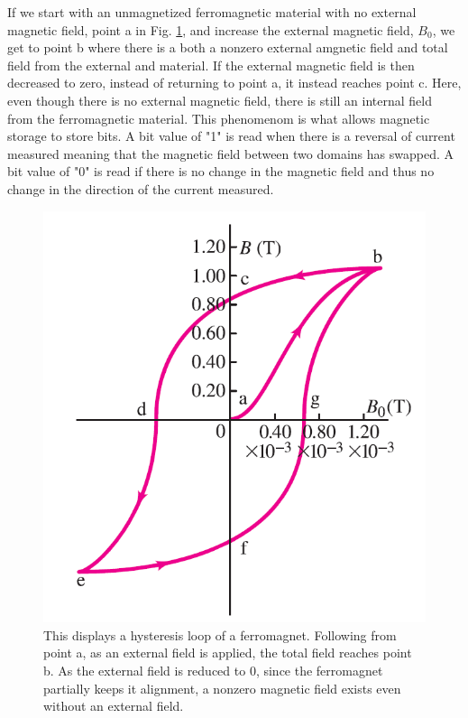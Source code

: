 \documentclass[ notitlepage, numerical, 11pt]{revtex4-1} %
\begin{document}
If we start with an unmagnetized ferromagnetic material with no external magnetic field, point a in Fig. \ref{hysteresis}, and increase the external magnetic field, $B_0$, we get to point b where there is a both a nonzero external amgnetic field and total field from the external and material. If the external magnetic field is then decreased to zero, instead of returning to point a, it instead reaches point c. Here, even though there is no external magnetic field, there is still an internal field from the ferromagnetic material. This phenomenom is what allows magnetic storage to store bits. A bit value of "1" is read when there is a reversal of current measured meaning that the magnetic field between two domains has swapped. A bit value of "0" is read if there is no change in the magnetic field and thus no change in the direction of the current measured.
	
\begin{figure}[H]
\centerline{\includegraphics[scale=.45]{hysteresis.png}}
\caption{This displays a hysteresis loop of a ferromagnet. Following from point a, as an external field is applied, the total field reaches point b. As the external field is reduced to 0, since the ferromagnet partially keeps it alignment, a nonzero magnetic field exists even without an external field.}
\label{hysteresis}
\end{figure}
\end{document}
